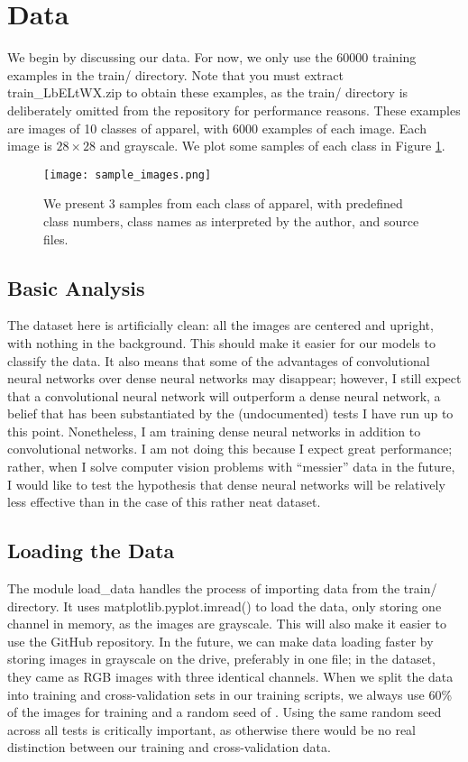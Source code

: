 \section{Data}
We begin by discussing our data. For now, we only use the 60000 training examples in the {\ttfamily train/} directory. Note that you must extract {\ttfamily train\_LbELtWX.zip} to obtain these examples, as the {\ttfamily train/} directory is deliberately omitted from the repository for performance reasons. These examples are images of 10 classes of apparel, with 6000 examples of each image. Each image is $28\times 28$ and grayscale. We plot some samples of each class in Figure \ref{fig:sampleimages}.

\begin{figure}
\texttt{[image: sample\_images.png]}
\caption{We present 3 samples from each class of apparel, with predefined class numbers, class names as interpreted by the author, and source files.}
\label{fig:sampleimages}
\end{figure}
\subsection{Basic Analysis}
The dataset here is artificially clean: all the images are centered and upright, with nothing in the background. This should make it easier for our models to classify the data. It also means that some of the advantages of convolutional neural networks over dense neural networks may disappear; however, I still expect that a convolutional neural network will outperform a dense neural network, a belief that has been substantiated by the (undocumented) tests I have run up to this point. Nonetheless, I am training dense neural networks in addition to convolutional networks. I am not doing this because I expect great performance; rather, when I solve computer vision problems with ``messier'' data in the future, I would like to test the hypothesis that dense neural networks will be relatively less effective than in the case of this rather neat dataset.
\subsection{Loading the Data}
The module {\ttfamily load\_data} handles the process of importing data from the {\ttfamily train/} directory. It uses {\ttfamily matplotlib.pyplot.imread()} to load the data, only storing one channel in memory, as the images are grayscale. This will also make it easier to use the GitHub repository. In the future, we can make data loading faster by storing images in grayscale on the drive, preferably in one file; in the dataset, they came as RGB images with three identical channels. When we split the data into training and cross-validation sets in our training scripts, we always use 60\% of the images for training and a random seed of {}. Using the same random seed across all tests is critically important, as otherwise there would be no real distinction between our training and cross-validation data.

